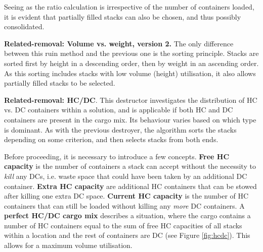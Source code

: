\documentclass[preprint,11pt,3p]{elsarticle}
\begin{document}
Seeing as the ratio calculation is irrespective of the number of containers loaded, it is evident that partially filled stacks can also be chosen, and thus possibly consolidated.

\textbf{Related-removal: Volume vs. weight, version 2.} The only difference between this ruin method and the previous one is the sorting principle. Stacks are sorted first by height in a descending order, then by weight in an ascending order. As this sorting includes stacks with low volume (height) utilisation, it also allows partially filled stacks to be selected.

\textbf{Related-removal: HC/DC}. This destructor investigates the distribution of HC vs. DC containers within a solution, and is applicable if both HC and DC containers are present in the cargo mix. Its behaviour varies based on which type is dominant. As with the previous destroyer, the algorithm sorts the stacks depending on some criterion, and then selects stacks from both ends. 

Before proceeding, it is necessary to introduce a few concepts. \textbf{Free HC capacity} is the number of containers a stack can accept without the necessity to \textit{kill} any DCs, i.e. waste space that could have been taken by an additional DC container. \textbf{Extra HC capacity} are additional HC containers that can be stowed after killing one extra DC space. \textbf{Current HC capacity} is the number of HC containers that can still be loaded without killing any \textit{more} DC containers. A \textbf{perfect HC/DC cargo mix} describes a situation, where the cargo contains a number of HC containers equal to the sum of free HC capacities of all stacks within a location and the rest of containers are DC (see Figure \ref{fig:hcdc}). This allows for a maximum volume utilisation. 
\end{document}
